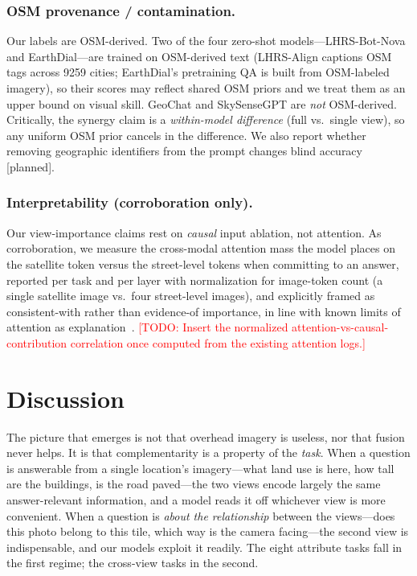 \documentclass[runningheads]{llncs}
\newcommand{\todo}[1]{\textcolor{red}{[TODO: #1]}}
\begin{document}
\subsubsection{OSM provenance / contamination.}
Our labels are OSM-derived. Two of the four zero-shot models---LHRS-Bot-Nova and
EarthDial---are trained on OSM-derived text (LHRS-Align captions OSM tags across
\num{9259} cities; EarthDial's pretraining QA is built from OSM-labeled imagery),
so their scores may reflect shared OSM priors and we treat them as an upper bound
on visual skill. GeoChat and SkySenseGPT are \emph{not} OSM-derived. Critically,
the synergy claim is a \emph{within-model difference} (\textsf{full} vs.\ single
view), so any uniform OSM prior cancels in the difference. We also report whether
removing geographic identifiers from the prompt changes \textsf{blind} accuracy
\textsf{[planned]}.

\subsubsection{Interpretability (corroboration only).}
Our view-importance claims rest on \emph{causal} input ablation, not attention.
As corroboration, we measure the cross-modal attention mass the model places on
the satellite token versus the street-level tokens when committing to an answer,
reported per task and per layer with normalization for image-token count (a
single satellite image vs.\ four street-level images), and explicitly framed as
consistent-with rather than evidence-of importance, in line with known limits of
attention as explanation~\cite{jain2019attention,wiegreffe2019attention}.
\todo{Insert the normalized attention-vs-causal-contribution correlation once
computed from the existing attention logs.}

\section{Discussion}
\label{sec:discussion}

The picture that emerges is not that overhead imagery is useless, nor that fusion
never helps. It is that complementarity is a property of the \emph{task}. When a
question is answerable from a single location's imagery---what land use is here,
how tall are the buildings, is the road paved---the two views encode largely the
same answer-relevant information, and a model reads it off whichever view is more
convenient. When a question is \emph{about the relationship} between the
views---does this photo belong to this tile, which way is the camera
facing---the second view is indispensable, and our models exploit it readily. The
eight attribute tasks fall in the first regime; the cross-view tasks in the
second.
\end{document}
